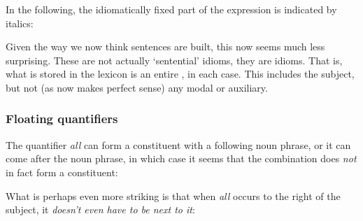 \documentclass{article}
\begin{document}
In the following, the idiomatically fixed part of the expression is indicated by italics:
\begin{exe}
\end{exe}
Given the way we now think sentences are built, this now seems much less surprising.
These are not actually `sentential' idioms, they are \emph{} idioms.
That is, what is stored in the lexicon is an entire \emph{}, in each case.
This includes the subject, but not (as now makes perfect sense) any modal or auxiliary.

\subsubsection{Floating quantifiers}

The quantifier \emph{all} can form a constituent with a following noun phrase, or it can come after the noun phrase, in which case it seems that the combination does \emph{not} in fact form a constituent:
\begin{exe}
\end{exe}
What is perhaps even more striking is that when \emph{all} occurs to the right of the subject, it \emph{doesn't even have to be next to it}:
\begin{exe}
\end{exe}
\end{document}
